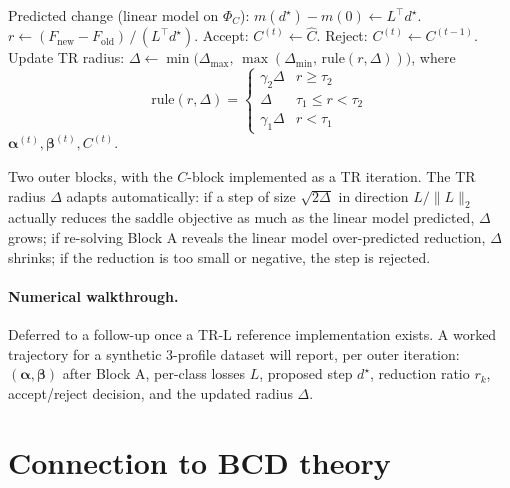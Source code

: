 \documentclass[11pt,a4paper]{article}
\begin{document}
\begin{algorithm}[H]
\begin{algorithmic}[1]
    \State Predicted change (linear model on $\Phi_C$): $m(d^\star) - m(0) \gets L^\top d^\star$.
    \State $r \gets (F_{\text{new}} - F_{\text{old}}) \,/\, (L^\top d^\star)$. 
     \State Accept: $C^{(t)} \gets \widehat C$. \Else \State Reject: $C^{(t)} \gets C^{(t-1)}$. \EndIf
    \State Update TR radius: $\Delta \gets \min\big(\Delta_{\max},\,\max(\Delta_{\min},\,\mathrm{rule}(r,\Delta))\big)$, where
    \[ \mathrm{rule}(r,\Delta) = \begin{cases}\gamma_2\Delta & r \ge \tau_2 \\ \Delta & \tau_1 \le r < \tau_2 \\ \gamma_1\Delta & r < \tau_1\end{cases} \]
        \State \Return $\boldsymbol{\alpha}^{(t)},\boldsymbol{\beta}^{(t)},C^{(t)}$.
    \EndIf
\EndFor
\end{algorithmic}
\end{algorithm}

Two outer blocks, with the $C$-block implemented as a TR iteration. The TR radius $\Delta$ adapts automatically: if a step of size $\sqrt{2\Delta}$ in direction $L/\|L\|_2$ actually reduces the saddle objective as much as the linear model predicted, $\Delta$ grows; if re-solving Block A reveals the linear model over-predicted reduction, $\Delta$ shrinks; if the reduction is too small or negative, the step is rejected.

\paragraph{Numerical walkthrough.} Deferred to a follow-up once a TR-L reference implementation exists. A worked trajectory for a synthetic 3-profile dataset will report, per outer iteration: $(\boldsymbol\alpha,\boldsymbol\beta)$ after Block A, per-class losses $L$, proposed step $d^\star$, reduction ratio $r_k$, accept/reject decision, and the updated radius $\Delta$.

\section{Connection to BCD theory}
\end{document}
